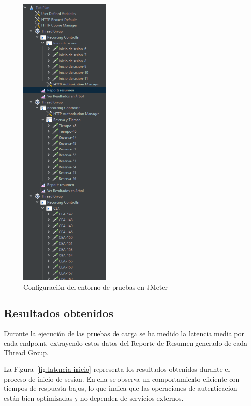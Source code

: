\begin{figure}[h!tb]
\centering
\includegraphics[width=0.4\textwidth]{figs/jmeter-config.png}
\caption{Configuración del entorno de pruebas en JMeter}
\label{fig:jmeter-config}
\end{figure}

\subsection{Resultados obtenidos}

Durante la ejecución de las pruebas de carga se ha medido la latencia media por cada endpoint, extrayendo estos datos del Reporte de Resumen generado de cada Thread Group.

La Figura~\ref{fig:latencia-inicio} representa los resultados obtenidos durante el proceso de inicio de sesión. En ella se observa un comportamiento eficiente con tiempos de respuesta bajos, lo que indica que las operaciones de autenticación están bien optimizadas y no dependen de servicios externos.


